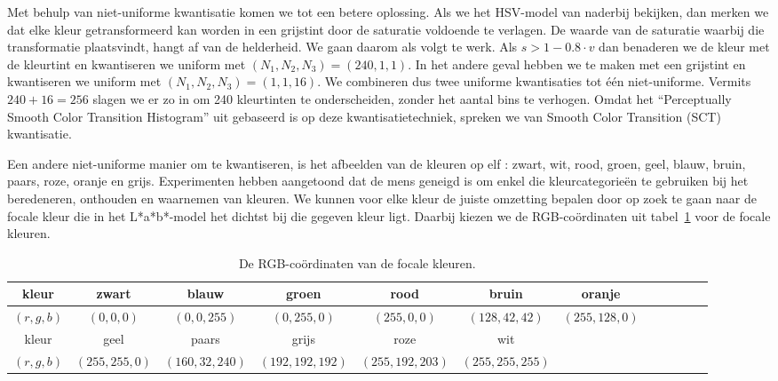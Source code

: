 Met behulp van niet-uniforme kwantisatie komen we tot een betere oplossing. Als we het HSV-model van naderbij
bekijken, dan merken we dat elke kleur getransformeerd kan worden in een grijstint door de saturatie
voldoende te verlagen. De waarde van de saturatie waarbij die transformatie plaatsvindt, hangt af
van de helderheid. We gaan daarom als volgt te werk. Als $s > 1 - 0.8 \cdot v$ dan benaderen we de kleur
met de kleurtint en kwantiseren we uniform met $(N_1,N_2,N_3)=(240,1,1)$. In het andere geval hebben we
te maken met een grijstint en kwantiseren we uniform met $(N_1,N_2,N_3)=(1,1,16)$. We combineren dus
twee uniforme kwantisaties tot \'e\'en niet-uniforme. Vermits $240 + 16 = 256$
slagen we er zo in om 240 kleurtinten te onderscheiden, zonder het aantal bins te verhogen. Omdat het
``Perceptually Smooth Color Transition Histogram'' uit \cite{sural:perceptually_smooth_histogram} 
gebaseerd is op deze kwantisatietechniek, spreken we van Smooth Color Transition (SCT) kwantisatie.  

Een andere niet-uniforme manier om te kwantiseren, is het afbeelden van de kleuren op elf 
 \cite{van_den_broek:human_color_categorization_for_cbir}: zwart, wit, rood, groen, geel, blauw, bruin, paars, roze, oranje en grijs.
Experimenten hebben aangetoond dat de mens geneigd is om enkel die kleurcategorie\"en te gebruiken bij 
het beredeneren, onthouden en waarnemen van kleuren. We kunnen voor elke kleur de juiste omzetting bepalen
door op zoek te gaan naar de focale kleur die in het L*a*b*-model het dichtst bij die gegeven kleur ligt.
Daarbij kiezen we de RGB-co\"ordinaten uit tabel~\ref{tab:coords_focale_kleuren} voor de focale kleuren.

\begin{table}[!bp]
\vspace{10pt}
\centering
\begin{tabular}{c|c@{ }c@{ }c@{ }c@{ }c@{ }c@{ }c@{ }c@{ }c@{ }c@{ }c}
kleur & zwart & blauw & groen & rood & bruin & oranje\\	
\hline
$(r,g,b)$ & $(0, 0, 0)$ & $(0,   0, 255)$ & $(0, 255,   0)$ & $(255,   0,   0)$ &
$(128,  42,  42)$ & $(255, 128,   0)$\vspace{8pt}\\
kleur & geel & paars & grijs & roze & wit\\	
\hline
$(r,g,b)$ & $(255, 255,   0)$ & $(160,  32, 240)$ & $(192, 192, 192)$ & $(255, 192, 203)$ & $(255, 255, 255)$
\end{tabular}
\vspace{10pt}
\caption{\label{tab:coords_focale_kleuren}De RGB-co\"ordinaten van de focale kleuren.}
\end{table}

